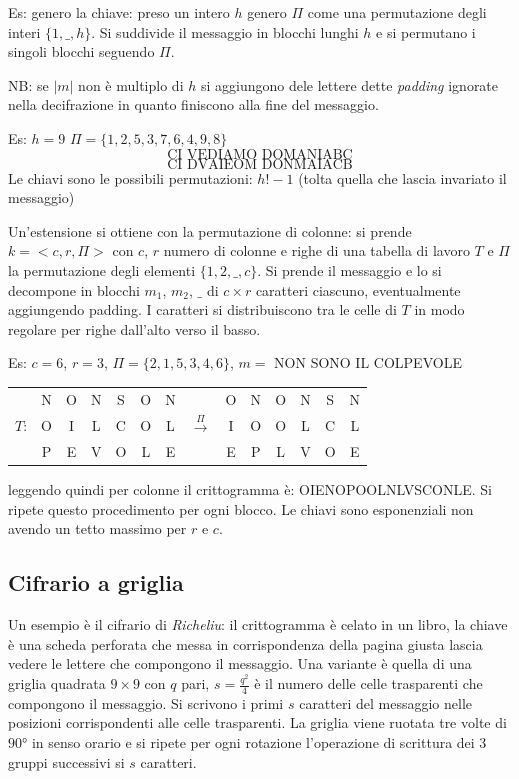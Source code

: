 Es: genero la chiave: preso un intero $h$ genero $\Pi$ come una permutazione degli interi $\{1,\_,h\}$. Si suddivide il messaggio in blocchi lunghi $h$ e si permutano i singoli blocchi seguendo $\Pi$.

NB: se $|m|$ non è multiplo di $h$ si aggiungono dele lettere dette \emph{padding} ignorate nella decifrazione in quanto finiscono alla fine del messaggio.

Es: $h = 9$ $\Pi=\{1, 2, 5, 3, 7, 6, 4, 9, 8\}$
$$ \text{CI VEDIAMO DOMANIABC} $$
$$ \text{CI DVAIEOM DONMAIACB} $$
Le chiavi sono le possibili permutazioni: $h!-1$ (tolta quella che lascia invariato il messaggio)

Un'estensione si ottiene con la permutazione di colonne: si prende $k=<c, r, \Pi>$ con $c$, $r$ numero di colonne e righe di una tabella di lavoro $T$ e $\Pi$ la permutazione degli elementi $\{1, 2, \_, c\}$. Si prende il messaggio e lo si decompone in blocchi $m_1$, $m_2$, $\_$ di $c \times r$ caratteri ciascuno, eventualmente aggiungendo padding. I caratteri si distribuiscono tra le celle di $T$ in modo regolare per righe dall'alto verso il basso.

Es: $c = 6$, $r = 3$, $\Pi=\{2, 1, 5, 3, 4, 6\}$, $m=$ NON SONO IL COLPEVOLE
\begin{table}[!ht]
    \centering
    \begin{tabular}{c c c c c c c c c c c c c c}
             & N & O & N & S & O & N &                      & O & N & O & N & S & N\\
        $T$: & O & I & L & C & O & L & $\xrightarrow{\Pi}$  & I & O & O & L & C & L\\
             & P & E & V & O & L & E &                      & E & P & L & V & O & E\\
    \end{tabular}
\end{table}
leggendo quindi per colonne il crittogramma è: OIENOPOOLNLVSCONLE. Si ripete questo procedimento per ogni blocco. Le chiavi sono esponenziali non avendo un tetto massimo per $r$ e $c$.


\subsection{Cifrario a griglia}
Un esempio è il cifrario di \emph{Richeliu}: il crittogramma è celato in un libro, la chiave è una scheda perforata che messa in corrispondenza della pagina giusta lascia vedere le lettere che compongono il messaggio. Una variante è quella di una griglia quadrata $9\times9$ con $q$ pari, $s = \frac{q^2}{4}$ è il numero delle celle trasparenti che compongono il messaggio. Si scrivono i primi $s$ caratteri del messaggio nelle posizioni corrispondenti alle celle trasparenti. La griglia viene ruotata tre volte di $90$° in senso orario e si ripete per ogni rotazione l'operazione di scrittura dei 3 gruppi successivi si $s$ caratteri.

